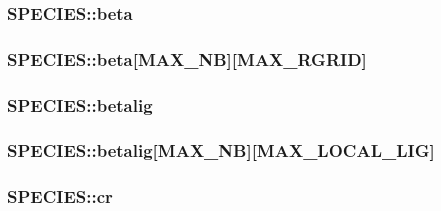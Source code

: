 \hypertarget{struct_s_p_e_c_i_e_s_abce582816ef8e72a5c3c39e9b3ef40cb}{
\subsubsection[{beta}]{ S\-P\-E\-C\-I\-E\-S\-::beta}}\label{struct_s_p_e_c_i_e_s_abce582816ef8e72a5c3c39e9b3ef40cb}
\hypertarget{struct_s_p_e_c_i_e_s_ad67c9a675e97411be085948ab3ff629a}{
\subsubsection[{beta}]{ S\-P\-E\-C\-I\-E\-S\-::beta\mbox{[}{\bf M\-A\-X\-\_\-\-N\-B}\mbox{]}\mbox{[}{\bf M\-A\-X\-\_\-\-R\-G\-R\-I\-D}\mbox{]}}}\label{struct_s_p_e_c_i_e_s_ad67c9a675e97411be085948ab3ff629a}
\hypertarget{struct_s_p_e_c_i_e_s_a0ceac016f025898c4f83151f3292447d}{
\subsubsection[{betalig}]{ S\-P\-E\-C\-I\-E\-S\-::betalig}}\label{struct_s_p_e_c_i_e_s_a0ceac016f025898c4f83151f3292447d}
\hypertarget{struct_s_p_e_c_i_e_s_a88ad61e62b6b39cade6c8d2b17043fb4}{
\subsubsection[{betalig}]{ S\-P\-E\-C\-I\-E\-S\-::betalig\mbox{[}{\bf M\-A\-X\-\_\-\-N\-B}\mbox{]}\mbox{[}{\bf M\-A\-X\-\_\-\-L\-O\-C\-A\-L\-\_\-\-L\-I\-G}\mbox{]}}}\label{struct_s_p_e_c_i_e_s_a88ad61e62b6b39cade6c8d2b17043fb4}
\hypertarget{struct_s_p_e_c_i_e_s_a0ac347ef077aa24591bb461c94a4daaf}{
\subsubsection[{cr}]{ S\-P\-E\-C\-I\-E\-S\-::cr}}\label{struct_s_p_e_c_i_e_s_a0ac347ef077aa24591bb461c94a4daaf}
